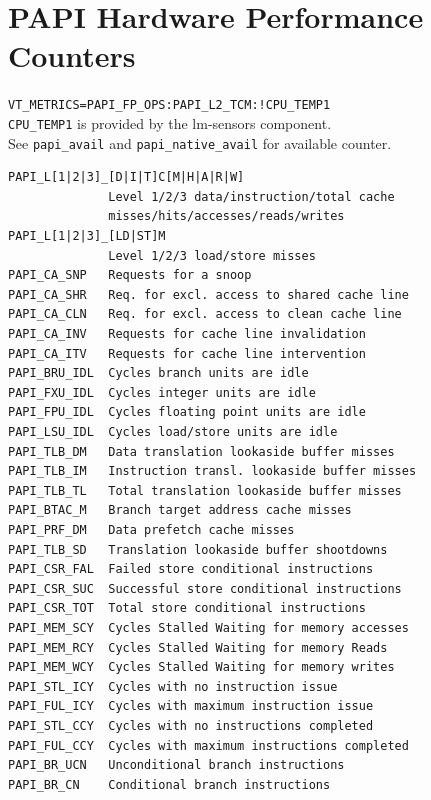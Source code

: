 \section{PAPI Hardware Performance Counters}
\verb|VT_METRICS=PAPI_FP_OPS:PAPI_L2_TCM:!CPU_TEMP1|\\
\texttt{CPU\_TEMP1} is provided by the lm-sensors component.\\ 
See \texttt{papi\_avail} and \texttt{papi\_native\_avail} for available counter.
\begin{scriptsize}
\begin{verbatim}
PAPI_L[1|2|3]_[D|I|T]C[M|H|A|R|W]    
              Level 1/2/3 data/instruction/total cache 
              misses/hits/accesses/reads/writes
PAPI_L[1|2|3]_[LD|ST]M    
              Level 1/2/3 load/store misses                       
PAPI_CA_SNP   Requests for a snoop                                
PAPI_CA_SHR   Req. for excl. access to shared cache line  
PAPI_CA_CLN   Req. for excl. access to clean cache line   
PAPI_CA_INV   Requests for cache line invalidation                
PAPI_CA_ITV   Requests for cache line intervention                
PAPI_BRU_IDL  Cycles branch units are idle                        
PAPI_FXU_IDL  Cycles integer units are idle                       
PAPI_FPU_IDL  Cycles floating point units are idle                
PAPI_LSU_IDL  Cycles load/store units are idle                    
PAPI_TLB_DM   Data translation lookaside buffer misses            
PAPI_TLB_IM   Instruction transl. lookaside buffer misses     
PAPI_TLB_TL   Total translation lookaside buffer misses           
PAPI_BTAC_M   Branch target address cache misses                  
PAPI_PRF_DM   Data prefetch cache misses                          
PAPI_TLB_SD   Translation lookaside buffer shootdowns             
PAPI_CSR_FAL  Failed store conditional instructions               
PAPI_CSR_SUC  Successful store conditional instructions           
PAPI_CSR_TOT  Total store conditional instructions                
PAPI_MEM_SCY  Cycles Stalled Waiting for memory accesses          
PAPI_MEM_RCY  Cycles Stalled Waiting for memory Reads             
PAPI_MEM_WCY  Cycles Stalled Waiting for memory writes            
PAPI_STL_ICY  Cycles with no instruction issue                    
PAPI_FUL_ICY  Cycles with maximum instruction issue               
PAPI_STL_CCY  Cycles with no instructions completed               
PAPI_FUL_CCY  Cycles with maximum instructions completed          
PAPI_BR_UCN   Unconditional branch instructions                   
PAPI_BR_CN    Conditional branch instructions                     

\end{verbatim}
\end{scriptsize}
